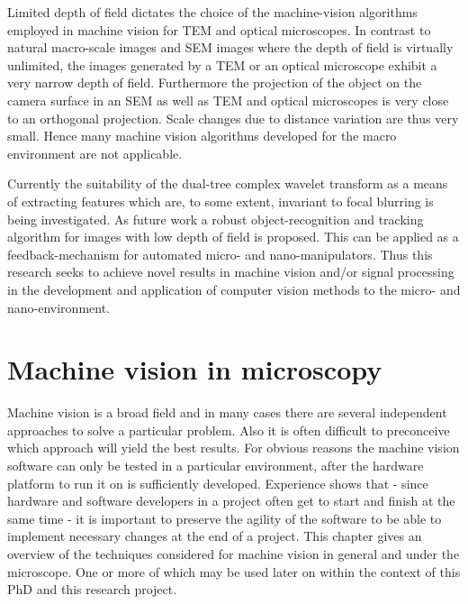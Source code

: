 \documentclass[a4paper,12pt]{book}
\begin{document}
Limited depth of field dictates the choice of the
machine-vision algorithms employed in machine vision for TEM and optical
microscopes. In contrast to natural macro-scale images and SEM images where
the depth of field is virtually unlimited, the images generated by a TEM or
an optical microscope exhibit a very narrow depth of field. Furthermore the
projection of the object on the camera surface in an SEM as well as TEM and
optical microscopes is very close to an orthogonal projection. Scale changes
due to distance variation are thus very small. Hence many machine vision
algorithms developed for the macro environment are not applicable.

Currently the suitability of the dual-tree complex wavelet transform as
a means of extracting features which are, to some extent, invariant to focal
blurring is being investigated. As future work a robust object-recognition and
tracking algorithm for images with low depth of field is proposed. This can
be applied as a feedback-mechanism for automated micro- and
nano-manipulators. Thus this research seeks to achieve novel results in
machine vision and/or signal processing in the development and application of
computer vision methods to the micro- and nano-environment.

\chapter{Machine vision in microscopy}
Machine vision is a broad field and in many cases there are several
independent approaches to solve a particular problem. Also it is often
difficult to preconceive which approach will yield the best results.
For obvious reasons the machine vision software can only be tested in
a particular environment, after the hardware platform to run it on is
sufficiently developed. Experience shows that - since hardware and software
developers in a project often get to start and finish at the same time -
it is important to preserve the agility of the software to be able to
implement necessary changes at the end of a project. This
chapter gives an overview of the techniques considered for machine vision
in general and under the microscope. One or more of which may be used later on
within the context of this PhD and this research project.
\end{document}
